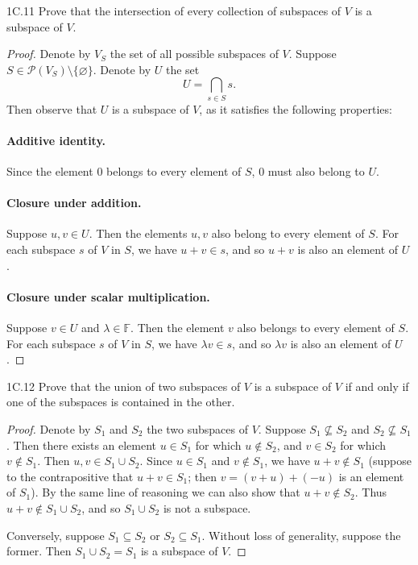 \documentclass{exam}
\begin{document}
\begin{problem}{1C.11}
    Prove that the intersection of every collection of subspaces of $V$ is a subspace of $V$.
\end{problem}

\begin{proof}
    Denote by $V_S$ the set of all possible subspaces of $V$. Suppose $S\in\mathscr{P}(V_S)\setminus\{\varnothing\}$. Denote by $U$ the set \[
        U = \bigcap_{s\in S}s.
    \]
    Then observe that $U$ is a subspace of $V$, as it satisfies the following properties:
    \paragraph{Additive identity.} Since the element $0$ belongs to every element of $S$, $0$ must also belong to $U$.

    \paragraph{Closure under addition.} Suppose $u, v\in U$. Then the elements $u, v$ also belong to every element of $S$. For each subspace $s$ of $V$ in $S$, we have $u + v\in s$, and so $u+v$ is also an element of $U$.

    \paragraph{Closure under scalar multiplication.} Suppose $v\in U$ and $\lambda\in\mathbb F$. Then the element $v$ also belongs to every element of $S$. For each subspace $s$ of $V$ in $S$, we have $\lambda v \in s$, and so $\lambda v$ is also an element of $U$.
\end{proof}

\begin{problem}{1C.12}
    Prove that the union of two subspaces of $V$ is a subspace of $V$ if and only if one of the subspaces is contained in the other.
\end{problem}

\begin{proof}
    Denote by $S_1$ and $S_2$ the two subspaces of $V$. Suppose $S_1\nsubseteq S_2$ and $S_2\nsubseteq S_1$. Then there exists an element $u\in S_1$ for which $u\notin S_2$, and $v\in S_2$ for which $v\notin S_1$. Then $u, v\in S_1\cup S_2$. Since $u\in S_1$ and $v\notin S_1$, we have $u + v\notin S_1$ (suppose to the contrapositive that $u + v\in S_1$; then $v = (v + u) + (-u)$ is an element of $S_1$). By the same line of reasoning we can also show that $u + v\notin S_2$. Thus $u + v\notin S_1\cup S_2$, and so $S_1\cup S_2$ is not a subspace.

    Conversely, suppose $S_1\subseteq S_2$ or $S_2\subseteq S_1$. Without loss of generality, suppose the former. Then $S_1\cup S_2 = S_1$ is a subspace of $V$.
\end{proof}
\end{document}
